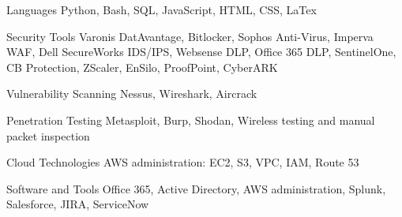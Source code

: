 
\begin{cvskills}
  \cvskill
    {Languages} %
    {Python, Bash, SQL, JavaScript, HTML, CSS, LaTex} %

  \cvskill
    {Security Tools} %
    {Varonis DatAvantage, Bitlocker, Sophos Anti-Virus, Imperva WAF, Dell SecureWorks IDS/IPS,\newline
     Websense DLP, Office 365 DLP, SentinelOne, CB Protection, ZScaler, EnSilo, ProofPoint, CyberARK} %

  \cvskill
    {Vulnerability Scanning} %
    {Nessus, Wireshark, Aircrack} %

  \cvskill
    {Penetration Testing} %
    {Metasploit, Burp, Shodan, Wireless testing and manual packet inspection} %

  \cvskill
    {Cloud Technologies} %
    {AWS administration: EC2, S3, VPC, IAM, Route 53} %

  \cvskill
    {Software and Tools} %
    {Office 365, Active Directory, AWS administration, Splunk, Salesforce, JIRA, ServiceNow} %

\end{cvskills}
